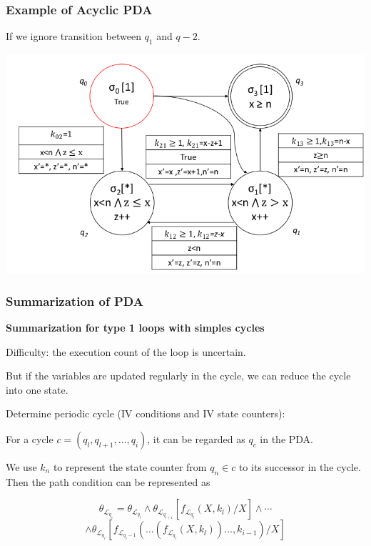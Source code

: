 \documentclass[11pt]{beamer}
\begin{document}
\begin{frame}\frametitle{Example of Acyclic PDA}
If we ignore transition between $q_1$ and $q-2$.
\begin{center}

\includegraphics[scale=0.3]{loopdetail.png}
\end{center}
\end{frame}
\begin{frame}\frametitle{Summarization of PDA}
\textbf{Summarization for type 1 loops with simples cycles}

Difficulty: the execution count of the loop is uncertain.

But if the variables are updated regularly in the cycle, we can reduce the cycle into one state.

Determine periodic cycle (IV conditions and IV state counters): 

For a cycle $c = (q_l, q_{l+1}, \ldots, q_i)$, it can be regarded as $q_c$ in the PDA.

We use $k_n$ to represent the state counter from $q_n\in c$ to its successor in the cycle. Then the path condition can be represented as

\[\theta_{\mathcal{L}_{q_c}} = \theta_{\mathcal{L}_{q_l}} \wedge \theta_{\mathcal{L}_{q_{l+1}}}[f_{\mathcal{L}_{q_l}}(X, k_l)/X] \wedge \cdots \]\[\wedge \theta_{\mathcal{L}_{q_i}}[f_{\mathcal{L}_{q_i - 1}}(\ldots(f_{\mathcal{L}_{q_l}}(X, k_l))\ldots, k_{i-1})/X]\]
\end{frame}
\end{document}
